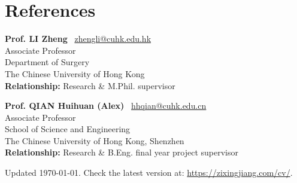 \documentclass[11pt,letterpaper]{report}
\newcommand{\listitemspace}{0.25em}
\renewenvironment{itemize}
{\begin{list}{}{\setlength{\leftmargin}{0em}
			\setlength{\parskip}{0em}
			\setlength{\itemsep}{\listitemspace}
			\setlength{\parsep}{\listitemspace}}}
	{\end{list}}
\begin{document}
\section*{References}
\begin{itemize}
	\item \textbf{Prof. LI Zheng} ~{\scriptsize \faEnvelope}\href{mailto:zhengli@cuhk.edu.hk}{zhengli@cuhk.edu.hk}\\
	Associate Professor\\
	Department of Surgery\\
	The Chinese University of Hong Kong\\
	\vspace{\listitemspace}
	\textbf{Relationship:} Research \& M.Phil. supervisor

	\vspace{10pt}
	\item \textbf{Prof. QIAN Huihuan (Alex)} ~{\scriptsize \faEnvelope}\href{mailto:hhqian@cuhk.edu.cn}{hhqian@cuhk.edu.cn}\\
	Associate Professor\\School of Science and Engineering\\The Chinese University of Hong Kong, Shenzhen\\
	\vspace{\listitemspace}
	\textbf{Relationship:} Research \& B.Eng. final year project supervisor

\end{itemize}
	
\begin{center}
	\vfill
	Updated \monthyeardate\today. Check the latest version at:  \href{https://zixingjiang.com/cv/}{https://zixingjiang.com/cv/}.
\end{center}
	
\end{document}
